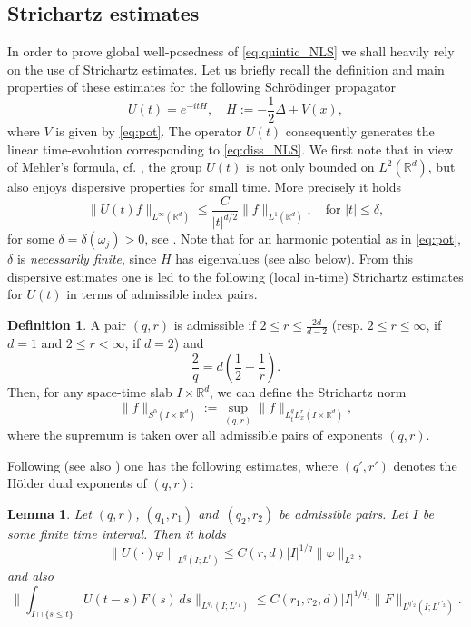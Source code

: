 \documentclass[a4paper,leqno]{amsart}
\theoremstyle{plain}
\newtheorem{lemma}[theorem]{Lemma}
\theoremstyle{definition}
\newtheorem{definition}[theorem]{Definition}
\numberwithin{equation}{section}
\begin{document}
\subsection{Strichartz estimates} 
In order to prove global well-posedness of \eqref{eq:quintic_NLS} we shall heavily rely on the use of Strichartz estimates.
Let us briefly recall the definition and main properties of these estimates
for the following Schr\"odinger propagator
\begin{equation*}
U(t)=e^{-itH},\quad H:= -\frac{1}{2}\Delta +V(x),
\end{equation*}
where $V$ is given by \eqref{eq:pot}. The operator $U(t)$ consequently generates the linear time-evolution corresponding to \eqref{eq:diss_NLS}.
We first note that in view of Mehler's formula, cf. \cite{Carles, Car1}, the group $U(t)$ is not only bounded on
$L^2({{\mathbb R}}^d)$, but also enjoys dispersive properties for small
time. More precisely it holds
\begin{equation}
\label{eq:dispest}
\lVert U(t)f \rVert_{L^\infty({{\mathbb R}}^d)}{\leqslant} \frac{C}{|t|^{d/2}}\lVert
f \rVert_{L^1({{\mathbb R}}^d)},\quad \text{for }|t|{\leqslant} \delta,
\end{equation}
for some $\delta=\delta(\omega_j)>0$, see \cite{Car1, Car2}. Note that for an harmonic potential as in
\eqref{eq:pot}, $\delta$ is
\emph{necessarily finite}, since $H$ has eigenvalues (see also below). 
From this dispersive estimates one is led to the following (local in-time) Strichartz estimates for $U(t)$ in terms of admissible index pairs.
\begin{definition}
A pair $(q,r)$ is admissible if $2{\leqslant} r
{\leqslant}\frac{2d}{d-2}$ (resp. $2{\leqslant} r{\leqslant} \infty$, if $d=1$ and $2{\leqslant} r<
\infty$, if $d=2$)
and
$$\frac{2}{q}= d\left( \frac{1}{2}-\frac{1}{r}\right).$$ 
Then, for any space-time slab $I\times{{\mathbb R}}^d$, we can define the Strichartz norm
\begin{equation*}
\|f\|_{S^0(I\times{{\mathbb R}}^d)}:=\sup_{(q, r)}\|f\|_{L^q_tL^r_x(I\times{{\mathbb R}}^d)},
\end{equation*}
where the supremum is taken over all admissible pairs of exponents $(q, r)$.
\end{definition}
Following \cite{KT} (see also \cite{Car1, Car2}) one has the following estimates, where $(q',r')$ denotes the H\"older dual exponents of $(q,r)$:
\begin{lemma}\label{thm:strich}
Let $(q,r)$, $(q_1,r_1)$ and~$ (q_2,r_2)$ be admissible pairs. Let $I$
be some finite time interval. Then it holds
\begin{equation*}\label{eq:strich}
 \left \| U(\cdot)\varphi \right\|_{L^q(I;L^r)}{\leqslant} C(r, d) |I|^{1/q} \| \varphi
 \|_{L^2},
\end{equation*}
and also
\begin{equation*}\label{eq:strichnl}
   \Big \| \int_{I\cap\{s\leq
   t\}} U(t-s)F(s) \, d s
   \Big \|_{L^{q_1}(I;L^{r_1})}{\leqslant} C(r_1,r_2, d) |I|^{1/q_1}  \|
   F \|_{L^{q'_2}(I;L^{r'_2})} .
 \end{equation*}
\end{lemma}
\end{document}
